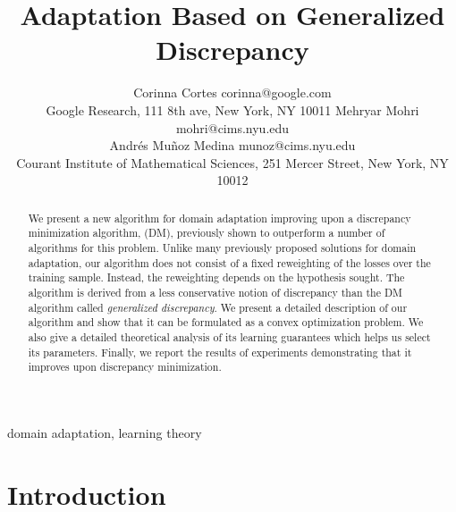 \documentclass[twoside,11pt]{article}
\newcommand{\1}{\mat{1}}
\begin{document}
\title{Adaptation Based on Generalized Discrepancy}

\author{Corinna Cortes {\email corinna@google.com} \\
\addr Google Research,  111 8th ave, New York, NY 10011
\AND
Mehryar Mohri {\email mohri@cims.nyu.edu} \\
Andr\'es Mu\~noz Medina {\email munoz@cims.nyu.edu} \\
\addr Courant Institute of Mathematical Sciences,
251 Mercer Street,
New York, NY 10012
}


\maketitle

\begin{abstract} %

We present a new algorithm for domain adaptation improving upon a
discrepancy minimization algorithm, (DM), previously shown to
outperform a number of algorithms for this problem. Unlike many
previously proposed solutions for domain adaptation, our algorithm does
not consist of a fixed reweighting of the losses over the training
sample. Instead, the reweighting depends on the hypothesis sought.
The algorithm is derived from a less conservative notion of
discrepancy than the DM algorithm called
\emph{generalized discrepancy}. We present a detailed description of
our algorithm and show that it can be formulated as a convex
optimization problem. We also give a detailed theoretical analysis of
its learning guarantees which helps us select its parameters.
Finally, we report the results of experiments demonstrating that it
improves upon discrepancy minimization.

\end{abstract}
\begin{keywords}
domain adaptation, learning theory
\end{keywords}

\section{Introduction}
\end{document}
